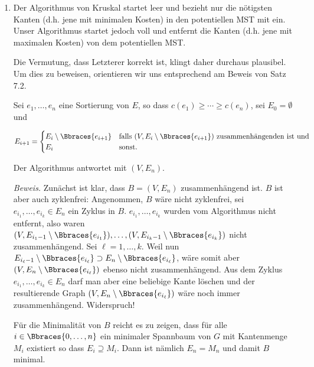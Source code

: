 \begin{solution}

\phantom{}

\begin{enumerate}[label = (\Alph*)]

    \item Der Algorithmus von Kruskal startet leer und bezieht nur die nötigsten Kanten (d.h. jene mit minimalen Kosten) in den potentiellen MST mit ein.
    Unser Algorithmus startet jedoch voll und entfernt die  Kanten (d.h. jene mit maximalen Kosten) von dem potentiellen MST.
    
    Die Vermutung, dass Letzterer korrekt ist, klingt daher durchaus plausibel.
    Um dies zu beweisen, orientieren wir uns entsprechend am Beweis von Satz 7.2.

    Sei $e_1, \dots, e_n$ eine Sortierung von $E$, so dass $c(e_1) \geq \cdots \geq c(e_n)$, sei $E_0 = \emptyset$ und

    \begin{align*}
        E_{i+1}
        =
        \begin{cases}
            E_i \setminus \Bbraces{e_{i+1}} & \text{falls}~ (V, E_i \setminus \Bbraces{e_{i+1}}) ~\text{zusammenhängenden ist und} \\
            E_i                             & \text{sonst.}
        \end{cases}
    \end{align*}

    Der Algorithmus antwortet mit $(V, E_n)$.

    \textit{Beweis.}
    Zunächst ist klar, dass $B = (V, E_n)$ zusammenhängend ist.
    $B$ ist aber auch zyklenfrei:
    Angenommen, $B$ wäre nicht zyklenfrei, sei $e_{i_1}, \dots, e_{i_k} \in E_n$ ein Zyklus in $B$.
    $e_{i_1}, \dots, e_{i_k}$ wurden vom Algorithmus nicht entfernt, also waren $(V, E_{i_1 - 1} \setminus \Bbraces{e_{i_1}}), \dots, (V, E_{i_k - 1} \setminus \Bbraces{e_{i_k}})$ nicht zusammenhängend.
    Sei $\ell = 1, \dots, k$.
    Weil nun $E_{i_\ell - 1} \setminus \Bbraces{e_{i_\ell}} \supset E_n \setminus \Bbraces{e_{i_\ell}}$, wäre somit aber $(V, E_n \setminus \Bbraces{e_{i_\ell}})$ ebenso nicht zusammenhängend.
    Aus dem Zyklus $e_{i_1}, \dots, e_{i_k} \in E_n$ darf man aber eine beliebige Kante löschen und der resultierende Graph $(V, E_n \setminus \Bbraces{e_{i_\ell}})$ wäre noch immer zusammenhängend.
    Widerspruch!

    Für die Minimalität von $B$ reicht es zu zeigen, dass für alle $i \in \Bbraces{0, \dots, n}$ ein minimaler Spannbaum von $G$ mit Kantenmenge $M_i$ existiert so dass $E_i \supseteq M_i$.
    Dann ist nämlich $E_n = M_n$ und damit $B$ minimal.


\end{enumerate}
\end{solution}
